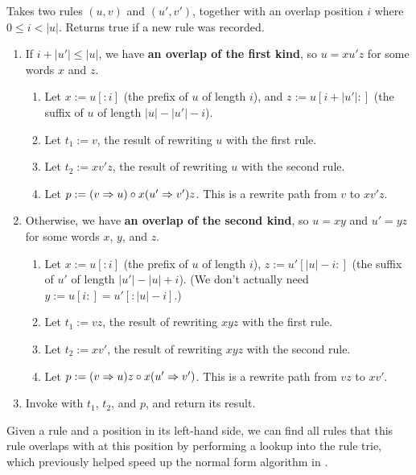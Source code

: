 \documentclass[../generics]{subfiles}
\begin{document}
\begin{algorithm}\label{critical pair algo}
Takes two rules $(u, v)$ and $(u', v')$, together with an overlap position $i$ where $0\leq i<|u|$. Returns true if a new rule was recorded.
\begin{enumerate}
\item If $i+|u'|\leq|u|$, we have \textbf{an overlap of the first kind}, so $u=xu'z$ for some words $x$ and $z$.
\begin{enumerate}
\item Let $x:=u[:i]$ (the prefix of $u$ of length $i$), and $z:=u[i+|u'|:]$ (the suffix of $u$ of length $|u|-|u'|-i$).
\item Let $t_1:=v$, the result of rewriting $u$ with the first rule.
\item Let $t_2:=xv' z$, the result of rewriting $u$ with the second rule.
\item Let $p:=(v\Rightarrow u)\circ x(u'\Rightarrow v')z$. This is a rewrite path from $v$ to $xv'z$.
\end{enumerate}
\item Otherwise, we have \textbf{an overlap of the second kind}, so $u=xy$ and $u'=yz$ for some words $x$, $y$, and $z$.
\begin{enumerate}
\item Let $x:=u[:i]$ (the prefix of $u$ of length $i$), $z:=u'[|u|-i:]$ (the suffix of $u'$ of length $|u'|-|u|+i$). (We don't actually need $y:=u[i:]=u'[:|u|-i]$.)
\item Let $t_1:=vz$, the result of rewriting $xyz$ with the first rule.
\item Let $t_2:=xv'$, the result of rewriting $xyz$ with the second rule.
\item Let $p:=(v\Rightarrow u)z\circ x(u'\Rightarrow v')$. This is a rewrite path from $vz$ to $xv'$.
\end{enumerate}
\item Invoke  with $t_1$, $t_2$, and $p$, and return its result.
\end{enumerate}
\end{algorithm}

Given a rule and a position in its left-hand side, we can find all rules that this rule overlaps with at this position by performing a lookup into the rule trie, which previously helped speed up the normal form algorithm in .
\end{document}
